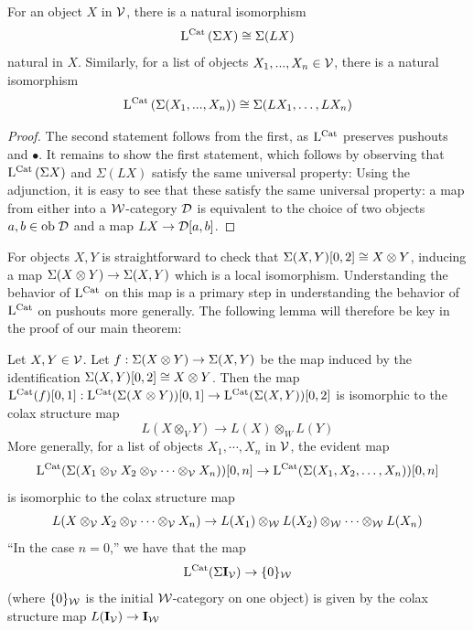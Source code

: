 \documentclass[12pt]{amsart}
\newcommand{\catsus}{{\Sigma}}
\begin{document}
\begin{lemma}\label{lem:catsus-preserved-by-adjoint}
	For an object $X$ in $\mathcal{V}$, there is a natural isomorphism
	$$\lcat \left( \catsus X \right) \cong \catsus (L X)  $$
	natural in $X$. Similarly, for a list of objects $X_1,...,X_n \in \mathcal{V}$, there is a natural isomorphism
	$$\lcat \left( \catsus(X_1,...,X_n) \right) \cong \catsus(L X_1, \dots, LX_n)$$
\end{lemma}
\begin{proof}
	The second statement follows from the first, as $\mathrm{L}^{\mathrm{Cat}}$ preserves pushouts and $\bullet$. It remains to show the first statement, which follows by observing that $\lcat \left( \catsus X \right)$ and  $\catsus (L X)  $ satisfy the same universal property:
	Using the adjunction, it is easy to see that these satisfy the same universal property: a map from either into a $\mathcal{W}$-category $\mathcal{D}$ is equivalent to the choice of two objects $a,b \in {\mathrm{ob}\;} \mathcal{D}$ and a map $LX \to \mathcal{D}[a,b]$.
\end{proof}
For objects $X,Y$ is straightforward to check that $\Sigma(X,Y)[0,2] \cong X \otimes Y$, inducing a map $\Sigma(X \otimes Y) \to \Sigma(X,Y)$ which is a local isomorphism. 
Understanding the behavior of $\mathrm{L}^{\mathrm{Cat}}$ on this map is a primary step in understanding the behavior of $\mathrm{L}^{\mathrm{Cat}}$ on pushouts more generally. 
The following lemma will therefore be key in the proof of our main theorem: 
\begin{lemma}\label{lem:join-of-intervals-is-colax-structure-map}
	 Let $X,Y \in \mathcal{V}$. 
	 Let $f: \Sigma(X \otimes Y) \to \Sigma(X,Y)$ be the map induced by the identification $\Sigma(X,Y)[0,2] \cong X \otimes Y$. 
	 Then the map $\mathrm{L}^{\mathrm{Cat}}(f)[0,1]: \mathrm{L}^{\mathrm{Cat}}(\Sigma (X \otimes Y))[0,1] \to \mathrm{L}^{\mathrm{Cat}}(\Sigma(X,Y))[0,2]$ is isomorphic to the colax structure map 
	 $$L(X \otimes_V Y) \to L(X) \otimes_W L(Y)$$
	 More generally, for a list of objects $X_1,\cdots,X_n$ in $\mathcal{V}$, the evident map
	 $$\mathrm{L}^{\mathrm{Cat}}(\Sigma (X_1 \otimes_\mathcal{V} X_2 \otimes_\mathcal{V} \cdots \otimes_\mathcal{V} X_n))[0,n] \to \mathrm{L}^{\mathrm{Cat}}(\Sigma(X_1,X_2, \dots, X_n))[0,n]$$
	 is isomorphic to the colax structure map 
	 $$L(X \otimes_\mathcal{V} X_2 \otimes_\mathcal{V} \cdots \otimes_\mathcal{V} X_n) \to L(X_1) \otimes_\mathcal{W} L(X_2) \otimes_\mathcal{W} \cdots \otimes_\mathcal{W} L(X_n)$$
	 ``In the case $n=0$,'' we have that the map
	 $$\mathrm{L}^{\mathrm{Cat}}(\Sigma \mathbf{I}_\mathcal{V}) \to \{0\}_\mathcal{W} $$
	 (where $\{0\}_\mathcal{W}$ is the initial $\mathcal{W}$-category on one object) is given by the colax structure map $L(\mathbf{I}_\mathcal{V}) \to \mathbf{I}_\mathcal{W}$
\end{lemma}
\end{document}
